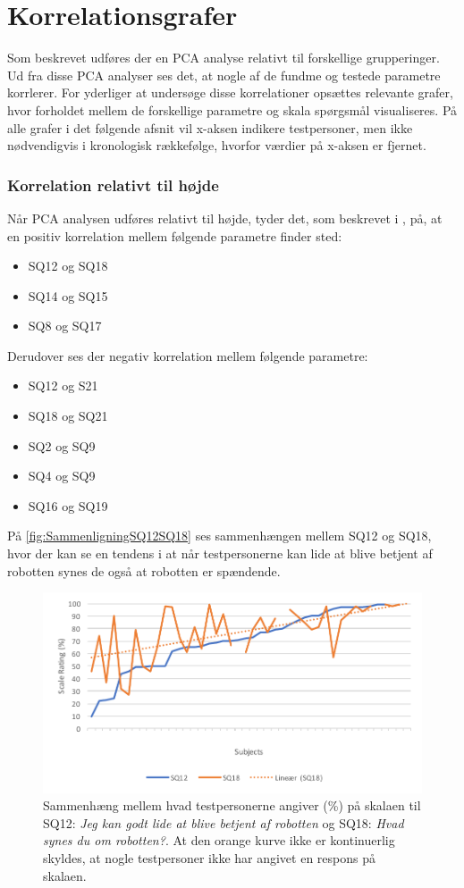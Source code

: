 \section{Korrelationsgrafer}
\label{DatabehandlingKorrelationsgrafer}
%
Som beskrevet udføres der en PCA analyse relativt til forskellige grupperinger. Ud fra disse PCA analyser ses det, at nogle af de fundme og testede parametre korrlerer. For yderliger at undersøge disse korrelationer opsættes relevante grafer, hvor forholdet mellem de forskellige parametre og skala spørgsmål visualiseres. På alle grafer i det følgende afsnit vil x-aksen indikere testpersoner, men ikke nødvendigvis i kronologisk rækkefølge, hvorfor værdier på x-aksen er fjernet.

\subsubsection{Korrelation relativt til højde}
Når PCA analysen udføres relativt til højde, tyder det, som beskrevet i , på, at en positiv korrelation mellem følgende parametre finder sted:
\begin{itemize}
	\item SQ12 og SQ18
	\item SQ14 og SQ15
	\item SQ8 og SQ17
\end{itemize}
%
Derudover ses der negativ korrelation mellem følgende parametre:
\begin{itemize}
	\item SQ12 og S21
	\item SQ18 og SQ21
	\item SQ2 og SQ9
	\item SQ4 og SQ9
	\item SQ16 og SQ19
\end{itemize}
%
På \autoref{fig:SammenligningSQ12SQ18} ses sammenhængen mellem SQ12 og SQ18, hvor der kan se en tendens i at når testpersonerne kan lide at blive betjent af robotten synes de også at robotten er spændende. 
%
\begin{figure}[H]
	\centering
	\includegraphics[width=\textwidth]{Figure/Korrelationsgrafer/SQ12+SQ18}
	\caption{Sammenhæng mellem hvad testpersonerne angiver (\%) på skalaen til SQ12: \textit{Jeg kan godt lide at blive betjent af robotten} og SQ18: \textit{Hvad synes du om robotten?}. At den orange kurve ikke er kontinuerlig skyldes, at nogle testpersoner ikke har angivet en respons på skalaen.}
	\label{fig:SammenligningSQ12SQ18}
\end{figure}
